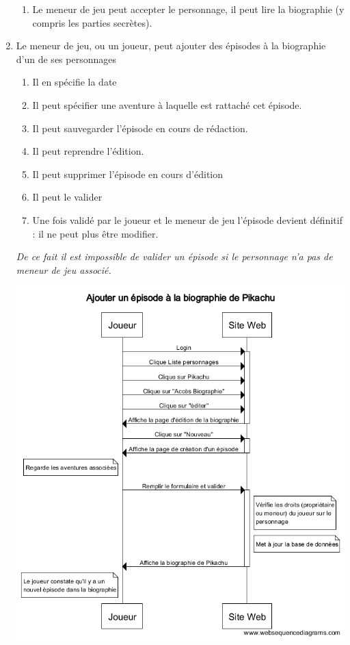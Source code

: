 \documentclass[a4paper, 11pt, titlepage]{article}
\begin{document}
\begin{enumerate}
\begin{enumerate}
        \item Le meneur de jeu peut accepter le personnage, il peut lire la biographie (y compris les parties secrètes).
      \end{enumerate}
      \item Le meneur de jeu, ou un joueur, peut ajouter des épisodes à la biographie d'un de ses personnages 
      \begin{enumerate}
        \item Il en spécifie la date
        \item Il peut spécifier une aventure à laquelle est rattaché cet épisode. 
        \item  Il peut sauvegarder l'épisode en cours de rédaction.
        \item Il peut reprendre l'édition.
        \item Il peut supprimer l'épisode en cours d'édition
        \item Il peut le valider
        \item Une fois validé par le joueur et le meneur de jeu l'épisode devient définitif : il ne peut plus être modifier.
      \end{enumerate}
      \textit{De ce fait il est impossible de valider un épisode si le personnage n'a pas de meneur de jeu associé.}
      \begin{center}\includegraphics[scale=0.5]{sequence/AjouterEpisodeBiographie.png} \end{center}

\end{enumerate}
\end{document}
